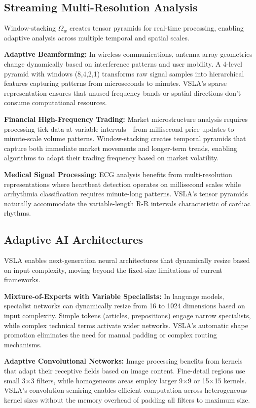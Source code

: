 \subsection{Streaming Multi-Resolution Analysis}

Window-stacking $\Omega_w$ creates tensor pyramids for real-time processing, enabling adaptive analysis across multiple temporal and spatial scales.

\textbf{Adaptive Beamforming:} In wireless communications, antenna array geometries change dynamically based on interference patterns and user mobility. A 4-level pyramid with windows (8,4,2,1) transforms raw signal samples into hierarchical features capturing patterns from microseconds to minutes. VSLA's sparse representation ensures that unused frequency bands or spatial directions don't consume computational resources.

\textbf{Financial High-Frequency Trading:} Market microstructure analysis requires processing tick data at variable intervals—from millisecond price updates to minute-scale volume patterns. Window-stacking creates temporal pyramids that capture both immediate market movements and longer-term trends, enabling algorithms to adapt their trading frequency based on market volatility.

\textbf{Medical Signal Processing:} ECG analysis benefits from multi-resolution representations where heartbeat detection operates on millisecond scales while arrhythmia classification requires minute-long patterns. VSLA's tensor pyramids naturally accommodate the variable-length R-R intervals characteristic of cardiac rhythms.

\subsection{Adaptive AI Architectures}

VSLA enables next-generation neural architectures that dynamically resize based on input complexity, moving beyond the fixed-size limitations of current frameworks.

\textbf{Mixture-of-Experts with Variable Specialists:} In language models, specialist networks can dynamically resize from 16 to 1024 dimensions based on input complexity. Simple tokens (articles, prepositions) engage narrow specialists, while complex technical terms activate wider networks. VSLA's automatic shape promotion eliminates the need for manual padding or complex routing mechanisms.

\textbf{Adaptive Convolutional Networks:} Image processing benefits from kernels that adapt their receptive fields based on image content. Fine-detail regions use small 3×3 filters, while homogeneous areas employ larger 9×9 or 15×15 kernels. VSLA's convolution semiring enables efficient computation across heterogeneous kernel sizes without the memory overhead of padding all filters to maximum size.

